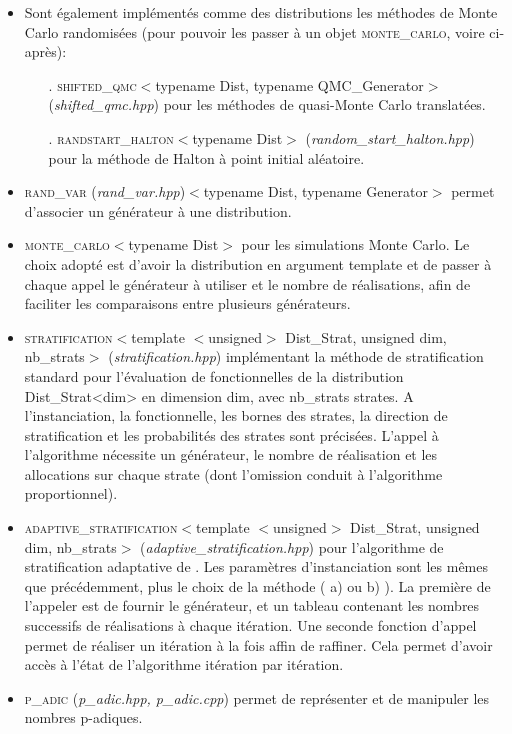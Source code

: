 \documentclass[12pt,a4paper]{report}
\newcommand{\source}[1]{\emph{#1}}
\newcommand{\class}[1]{\textsc{#1}}
\begin{document}
\begin{itemize}
	\item Sont également implémentés comme des distributions les méthodes de Monte Carlo randomisées (pour pouvoir les passer à un objet \class{monte\_carlo}, voire ci-après):
	\begin{itemize}
		\item[.] \class{shifted\_qmc}$<$typename Dist, typename QMC\_Generator$>$ (\source{shifted\_qmc.hpp}) pour les méthodes de quasi-Monte Carlo translatées.
		\item[.] \class{randstart\_halton}$<$typename Dist$>$ (\source{random\_start\_halton.hpp}) pour la méthode de Halton à point initial aléatoire.\\
	\end{itemize}
	
	\item \class{rand\_var} (\source{rand\_var.hpp})$<$typename Dist, typename Generator$>$ permet d'associer un générateur à une distribution.\\
	
	\item \class{monte\_carlo}$<$typename Dist$>$ pour les simulations Monte Carlo. Le choix adopté est d'avoir la distribution en argument template et de passer à chaque appel le générateur à utiliser et le nombre de réalisations, afin de faciliter les comparaisons entre plusieurs générateurs.\\
	
	\item \class{stratification}$<$template $<$unsigned$>$ Dist\_Strat, unsigned dim, nb\_strats$>$ (\source{stratification.hpp}) implémentant la méthode de stratification standard pour l'évaluation de fonctionnelles de la distribution Dist\_Strat<dim> en dimension dim, avec nb\_strats strates. A l'instanciation, la fonctionnelle, les bornes des strates, la direction de stratification et les probabilités des strates sont précisées. L'appel à l'algorithme nécessite un générateur, le nombre de réalisation et les allocations sur chaque strate (dont l'omission conduit à l'algorithme proportionnel).\\
	
	\item  \class{adaptive\_stratification}$<$template $<$unsigned$>$ Dist\_Strat, unsigned dim, nb\_strats$>$ (\source{adaptive\_stratification.hpp}) pour l'algorithme de stratification adaptative de \cite{EJ08}. Les paramètres d'instanciation sont les mêmes que précédemment, plus le choix de la méthode ( a) ou b) ). La première de l'appeler est de fournir le générateur, et un tableau contenant les nombres successifs de réalisations à chaque itération. Une seconde fonction d'appel permet de réaliser un itération à la fois affin de raffiner. Cela permet d'avoir accès à l'état de l'algorithme itération par itération.\\
	
	\item \class{p\_adic} (\source{p\_adic.hpp, p\_adic.cpp}) permet de représenter et de manipuler les nombres p-adiques.\\
\end{itemize}
\end{document}
